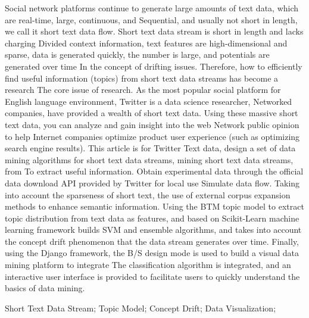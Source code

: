 \documentclass{swfuthesis}
\begin{document}
\begin{EAbstract} %
Social network platforms continue to generate large amounts of text data, which are real-time, large, continuous, and
Sequential, and usually not short in length, we call it short text data flow. Short text data stream is short in length and lacks charging Divided context information, text features are high-dimensional and sparse, data is generated quickly, the number is large, and potentials are generated over time
In the concept of drifting issues. Therefore, how to efficiently find useful information (topics) from short text data streams has become a research
The core issue of research. As the most popular social platform for English language
environment, Twitter is a data science researcher, Networked companies, have provided a
wealth of short text data. Using these massive short text data, you can analyze and gain
insight into the web Network public opinion to help Internet companies optimize product user experience (such as optimizing search engine results). This article is for Twitter
Text data, design a set of data mining algorithms for short text data streams, mining short text data streams, from
To extract useful information. Obtain experimental data through the official data download API provided by Twitter for local use
Simulate data flow. Taking into account the sparseness of short text, the use of external corpus expansion methods to enhance semantic information.
Using the BTM topic model to extract topic distribution from text data as features, and
based on Scikit-Learn machine learning framework builds SVM and ensemble algorithms, and takes into account the concept drift phenomenon that the data stream generates over time.
Finally, using the Django framework, the B/S design mode is used to build a visual data mining platform to integrate
The classification algorithm is integrated, and an interactive user interface is provided to facilitate users to quickly understand the basics of data mining.
\end{EAbstract}

\begin{EKeyword} %
Short Text Data Stream; Topic Model; Concept Drift; Data
Visualization; 
\end{EKeyword}

\tableofcontents     %
\listoffigures       %
\listoftables        %

\mainmatter
\end{document}
